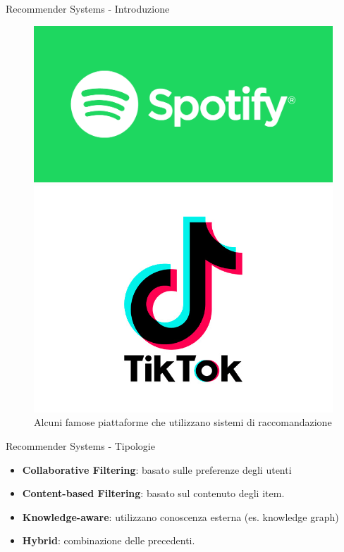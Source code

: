 \begin{frame}{Recommender Systems - Introduzione}
\begin{figure}[h!]
\begin{minipage}{0.15\textwidth}
    \end{minipage}\hfill
    \begin{minipage}{0.15\textwidth}
        \centering
        \includegraphics[width=\textwidth]{images/spotify.png}
    \end{minipage}\hfill
    \begin{minipage}{0.15\textwidth}
        \centering
        \includegraphics[width=\textwidth]{images/tiktok.png}
    \end{minipage}
    \caption{Alcuni famose piattaforme che utilizzano sistemi di raccomandazione}
\end{figure}
\end{frame}

\begin{frame}{Recommender Systems - Tipologie}
\begin{itemize}
    \item \textbf{Collaborative Filtering}: basato sulle preferenze degli utenti
    \item \textbf{Content-based Filtering}: basato sul contenuto degli item.
    \item \textbf{Knowledge-aware}: utilizzano conoscenza esterna (es. knowledge graph)
    \item \textbf{Hybrid}: combinazione delle precedenti.
\end{itemize}
\end{frame}

